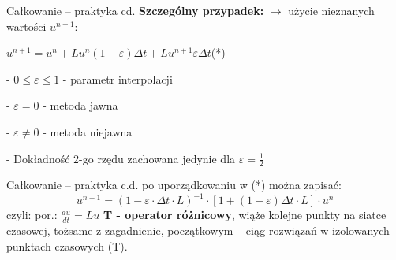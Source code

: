 \begin{frame}{Całkowanie -- praktyka cd.}
  \textbf{Szczególny przypadek:} $\rightarrow$ użycie nieznanych wartości $u^{n+1}$:
  \begin{center}
  	$u^{n+1} = u^n+Lu^n(1-\varepsilon)\Delta t+Lu^{n+1}\varepsilon \Delta t $\qquad(*)
  \end{center}
  \begin{description}
    \item - $0 \leqslant \varepsilon \leqslant 1$ - parametr interpolacji
    \item - $\varepsilon = 0$ - metoda jawna
    \item - $\varepsilon \not= 0$ - metoda niejawna
    \item - Dokładność 2-go rzędu zachowana jedynie dla $\varepsilon=\frac{1}{2}$
  \end{description}

\end{frame}
\begin{frame}{Całkowanie -- praktyka c.d.}
  po uporządkowaniu w (*) można zapisać:
  $${u}^{n+1} = (1-\varepsilon\cdot\Delta t\cdot L)^{-1}\cdot[1+(1-\varepsilon)\Delta t\cdot L]\cdot u^n $$
  czyli:  \qquad por.: $\frac{du}{dt} = Lu$\newline\newline\newline
  \textbf{T - operator różnicowy}, wiąże kolejne punkty na siatce czasowej, tożsame z zagadnienie, początkowym -- ciąg rozwiązań w izolowanych punktach czasowych (T).
\end{frame}
